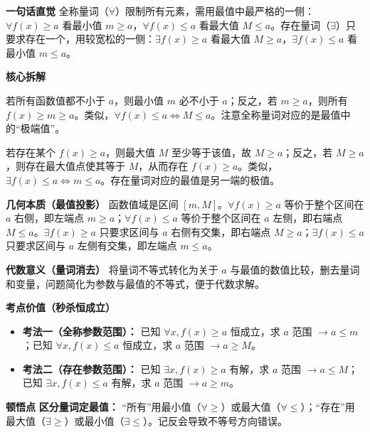 \begin{explanationbox}
	\textbf{\textcolor{CExplanation}{一句话直觉}}
	全称量词（$\forall$）限制所有元素，需用最值中最严格的一侧：$\forall f(x)\ge a$ 看最小值 $m\ge a$，$\forall f(x)\le a$ 看最大值 $M\le a$。存在量词（$\exists$）只要求存在一个，用较宽松的一侧：$\exists f(x)\ge a$ 看最大值 $M\ge a$，$\exists f(x)\le a$ 看最小值 $m\le a$。

	\medskip
	\textbf{\textcolor{CExplanation}{核心拆解}}
	\begin{description}[style=nextline, leftmargin=2.8em, labelsep=0.5em, itemsep=0.45em]
		\item[\textbf{要点一（全称转化规律）：}]
			若所有函数值都不小于 $a$，则最小值 $m$ 必不小于 $a$；反之，若 $m\ge a$，则所有 $f(x)\ge m\ge a$。类似，$\forall f(x)\le a \iff M\le a$。注意全称量词对应的是最值中的“极端值”。
		\item[\textbf{要点二（存在转化规律）：}]
			若存在某个 $f(x)\ge a$，则最大值 $M$ 至少等于该值，故 $M\ge a$；反之，若 $M\ge a$，则存在最大值点使其等于 $M$，从而存在 $f(x)\ge a$。类似，$\exists f(x)\le a \iff m\le a$。存在量词对应的最值是另一端的极值。
	\end{description}

	\medskip
	\textbf{\textcolor{CExplanation}{几何本质（最值投影）}}
	函数值域是区间 $[m,M]$。$\forall f(x)\ge a$ 等价于整个区间在 $a$ 右侧，即左端点 $m\ge a$；$\forall f(x)\le a$ 等价于整个区间在 $a$ 左侧，即右端点 $M\le a$。$\exists f(x)\ge a$ 只要求区间与 $a$ 右侧有交集，即右端点 $M\ge a$；$\exists f(x)\le a$ 只要求区间与 $a$ 左侧有交集，即左端点 $m\le a$。

	\medskip
	\textbf{\textcolor{CExplanation}{代数意义（量词消去）}}
	将量词不等式转化为关于 $a$ 与最值的数值比较，删去量词和变量，问题简化为参数与最值的不等式，便于代数求解。

	\medskip
	\textbf{\textcolor{CExplanation}{考点价值（秒杀恒成立）}}
	\begin{itemize}[leftmargin=*, itemsep=0.5em, topsep=0.4em]
		\item \textbf{考法一（全称参数范围）：} 已知 $\forall x,f(x)\ge a$ 恒成立，求 $a$ 范围 $\rightarrow a\le m$；已知 $\forall x,f(x)\le a$ 恒成立，求 $a$ 范围 $\rightarrow a\ge M$。
		\item \textbf{考法二（存在参数范围）：} 已知 $\exists x,f(x)\ge a$ 有解，求 $a$ 范围 $\rightarrow a\le M$；已知 $\exists x,f(x)\le a$ 有解，求 $a$ 范围 $\rightarrow a\ge m$。
	\end{itemize}

	\medskip
	\textbf{\textcolor{CExplanation}{顿悟点}}
	\textbf{区分量词定最值：} “所有”用最小值（$\forall\ge$）或最大值（$\forall\le$）；“存在”用最大值（$\exists\ge$）或最小值（$\exists\le$）。记反会导致不等号方向错误。


\end{explanationbox}
